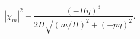 \begin{equation}
|\chi_{m}|^{2} - \frac{(- H \eta)^{3}}{2 H \sqrt{(m/H)^{2} + (- p \eta)^{2}}}.
\end{equation}

